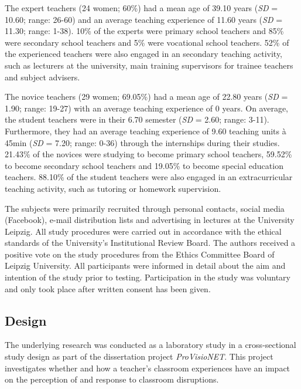 \documentclass[
  man]{apa6}
\begin{document}
The expert teachers (24 women; 60\%) had a mean age of 39.10 years (\emph{SD} = 10.60; range: 26-60) and an average teaching experience of 11.60 years (\emph{SD} = 11.30; range: 1-38).
10\% of the experts were primary school teachers and 85\% were secondary school teachers and 5\% were vocational school teachers. 52\% of the experienced teachers were also engaged in an secondary teaching activity, such as lecturers at the university, main training supervisors for trainee teachers and subject advisers.

The novice teachers (29 women; 69.05\%) had a mean age of 22.80 years (\emph{SD} = 1.90; range: 19-27) with an average teaching experience of 0 years. On average, the student teachers were in their 6.70 semester (\emph{SD} = 2.60; range: 3-11). Furthermore, they had an average teaching experience of 9.60 teaching units à 45min (\emph{SD} = 7.20; range: 0-36) through the internships during their studies.
21.43\% of the novices were studying to become primary school teachers, 59.52\% to become secondary school teachers and 19.05\% to become special education teachers. 88.10\% of the student teachers were also engaged in an extracurricular teaching activity, such as tutoring or homework supervision.

The subjects were primarily recruited through personal contacts, social media (Facebook), e-mail distribution lists and advertising in lectures at the University Leipzig. All study procedures were carried out in accordance with the ethical standards of the University's Institutional Review Board. The authors received a positive vote on the study procedures from the Ethics Committee Board of Leipzig University. All participants were informed in detail about the aim and intention of the study prior to testing. Participation in the study was voluntary and only took place after written consent has been given.

\subsection{Design}\label{design}

The underlying research was conducted as a laboratory study in a cross-sectional study design as part of the dissertation project \emph{ProVisioNET}. This project investigates whether and how a teacher's classroom experiences have an impact on the perception of and response to classroom disruptions.
\end{document}

